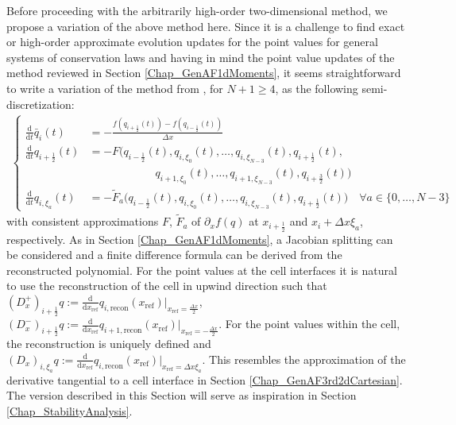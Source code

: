 \documentclass[12pt,a4paper]{article}
\newcommand{\dd}{\mathrm d}
\begin{document}
Before proceeding with the arbitrarily high-order two-dimensional method, we propose a variation of the above method here. Since it is a challenge to find exact or high-order approximate evolution updates for the point values for general systems of conservation laws and having in mind the point value updates of the method reviewed in Section \ref{Chap_GenAF1dMoments}, it seems straightforward to write a variation of the method from \cite{AB2023ExtensionAF}, for $N+1\geq 4$, as the following semi-discretization:
\begin{align*}
	\left\lbrace
	\begin{aligned}
		\frac{\mathrm d}{\mathrm d t} \bar q_i(t) &= -\frac{f(q_{i+\frac{1}{2}}(t)) - f(q_{i-\frac{1}{2}}(t))}{\Delta x}\\
		\frac{\mathrm d}{\mathrm d t} q_{i+\frac{1}{2}}(t) &= -F\Big(q_{i-\frac{1}{2}}(t), q_{i,\xi_0}(t), \dots, q_{i,\xi_{N-3}}(t),
												q_{i+\frac{1}{2}}(t), \\
												& \hspace{6em} q_{i+1,\xi_0}(t), \dots, q_{i+1,\xi_{N-3}}(t),
												 q_{i+\frac{3}{2}}(t)\Big)\\
		\frac{\mathrm d}{\mathrm d t} q_{i,\xi_a}(t) &= -\tilde F_a\Big(q_{i-\frac{1}{2}}(t), q_{i,\xi_0}(t), \dots, q_{i,\xi_{N-3}}(t),
												q_{i+\frac{1}{2}}(t)\Big) \quad \forall a \in \{0, \dots, N-3\}
	\end{aligned}
	\right.
\end{align*}
with consistent approximations $F$, $\tilde F_a$ of $\partial_x f(q)$ at $x_{i+\frac{1}{2}}$ and $x_i + \Delta x \xi_a$, respectively.
As in Section \ref{Chap_GenAF1dMoments}, a Jacobian splitting can be considered and a finite difference formula can be derived from the reconstructed polynomial. For the point values at the cell interfaces it is natural to use the reconstruction of the cell in upwind direction such that \((D^+_x)_{i+\frac12}q := \frac{\dd}{\dd x_\mathrm{ref}}q_{i, \mathrm{recon}}(x_\mathrm{ref})\vert_{x_\mathrm{ref}=\frac{\Delta x}{2}}\),  \((D^-_x)_{i+\frac12}q := \frac{\dd}{\dd x_\mathrm{ref}}q_{i+1, \mathrm{recon}}(x_\mathrm{ref})\vert_{x_\mathrm{ref}=-\frac{\Delta x}{2}}\). For the point values within the cell, the reconstruction is uniquely defined and \((D_x)_{i, \xi_a}q := \frac{\dd}{\dd x_\mathrm{ref}}q_{i, \mathrm{recon}}(x_\mathrm{ref})\vert_{x_\mathrm{ref}=\Delta x \xi_a}\). This resembles the approximation of the derivative tangential to a cell interface in Section \ref{Chap_GenAF3rd2dCartesian}. The version described in this Section will serve as inspiration in Section \ref{Chap_StabilityAnalysis}.
\end{document}
